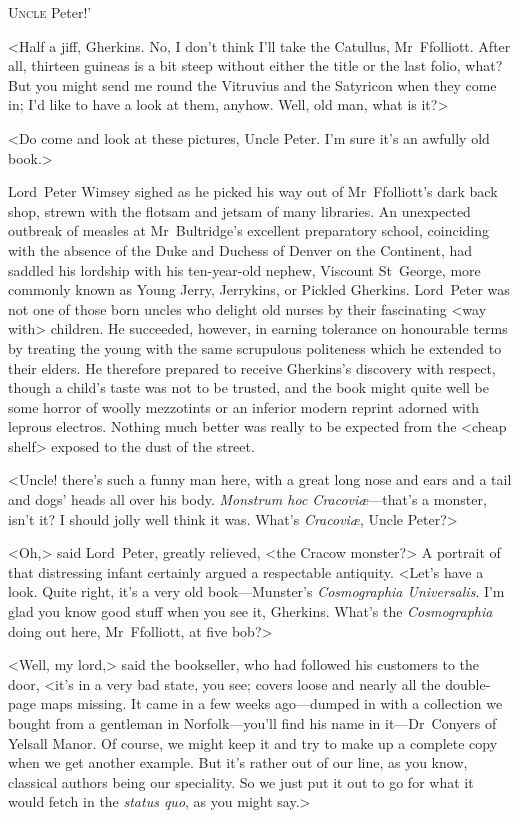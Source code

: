 
\lettrine[lines=4,ante=‘]{U}{ncle} Peter!'

\zz
<Half a jiff, Gherkins. No, I don't think I'll take the Catullus, Mr~Ffolliott. After all, thirteen guineas is a bit steep without either the title or the last folio, what? But you might send me round the Vitruvius and the Satyricon when they come in; I'd like to have a look at them, anyhow. Well, old man, what is it?>

<Do come and look at these pictures, Uncle Peter. I'm sure it's an awfully old book.>

Lord~Peter Wimsey sighed as he picked his way out of Mr~Ffolliott's dark back shop, strewn with the flotsam and jetsam of many libraries. An unexpected outbreak of measles at Mr~Bultridge's excellent preparatory school, coinciding with the absence of the Duke and Duchess of Denver on the Continent, had saddled his lordship with his ten-year-old nephew, Viscount St~George, more commonly known as Young Jerry, Jerrykins, or Pickled Gherkins. Lord~Peter was not one of those born uncles who delight old nurses by their fascinating <way with> children. He succeeded, however, in earning tolerance on honourable terms by treating the young with the same scrupulous politeness which he extended to their elders. He therefore prepared to receive Gherkins's discovery with respect, though a child's taste was not to be trusted, and the book might quite well be some horror of woolly mezzotints or an inferior modern reprint adorned with leprous electros. Nothing much better was really to be expected from the <cheap shelf> exposed to the dust of the street.

<Uncle! there's such a funny man here, with a great long nose and ears and a tail and dogs' heads all over his body. \textit{Monstrum hoc Cracoviæ}—that's a monster, isn't it? I should jolly well think it was. What's \textit{Cracoviæ}, Uncle Peter?>

<Oh,> said Lord~Peter, greatly relieved, <the Cracow monster?> A portrait of that distressing infant certainly argued a respectable antiquity. <Let's have a look. Quite right, it's a very old book—Munster's \textit{Cosmographia Universalis}. I'm glad you know good stuff when you see it, Gherkins. What's the \textit{Cosmographia} doing out here, Mr~Ffolliott, at five bob?>

<Well, my lord,> said the bookseller, who had followed his customers to the door, <it's in a very bad state, you see; covers loose and nearly all the double-page maps missing. It came in a few weeks ago—dumped in with a collection we bought from a gentleman in Norfolk—you'll find his name in it—Dr~Conyers of Yelsall Manor. Of course, we might keep it and try to make up a complete copy when we get another example. But it's rather out of our line, as you know, classical authors being our speciality. So we just put it out to go for what it would fetch in the \textit{status quo}, as you might say.>

